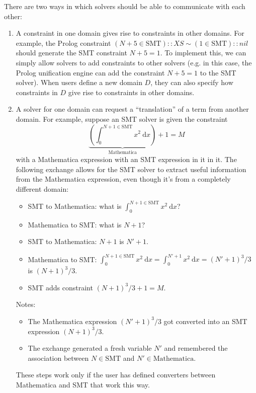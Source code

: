 \documentclass[10pt]{article}
\begin{document}
\noindent There are two ways in which solvers should be able to communicate
with each other: \begin{enumerate}
\item A constraint in one domain gives rise to constraints in other domains.
  For example, the Prolog constraint
  $(N + 5\in\textrm{SMT})::XS \sim (1\in\textrm{SMT})::nil$ should generate
  the SMT constraint $N + 5 = 1$. To implement this, we can simply
  allow solvers to add constraints to other solvers (e.g. in this case,
  the Prolog unification engine can add the constraint $N + 5 = 1$ to the
  SMT solver). When users define a new domain $D$, they can also specify how
  constraints in $D$ give rise to constraints in other domains.
\item A solver for one domain can request a ``translation'' of a term from another
  domain. For example, suppose an SMT solver is given the constraint
  \[{\underbrace{\left(\int_0^{N+1\in\textrm{SMT}}x^2~\mathrm dx\right)}
     _{\textrm{Mathematica}}} + 1 = M\]
  with a Mathematica expression with an SMT expression in it in it.
  The following exchange allows for the SMT
  solver to extract useful information from the Mathematica expression, even though
  it's from a completely different domain: \begin{itemize}
  \item SMT to Mathematica: what is
    $\displaystyle\int_0^{N+1\in\textrm{SMT}}x^2~\mathrm dx$?
  \item Mathematica to SMT: what is $N+1$?
  \item SMT to Mathematica: $N+1$ is $N'+1$.
  \item Mathematica to SMT:
    $\displaystyle\int_0^{N+1\in\textrm{SMT}}x^2~\mathrm dx
    =\displaystyle\int_0^{N'+1}x^2~\mathrm dx
    = (N'+1)^3/3$ is $(N+1)^3/3$.
  \item SMT adds constraint $(N+1)^3/3 + 1 = M$.
  \end{itemize}

  Notes: \begin{itemize}
  \item The Mathematica expression $(N'+1)^3/3$ got converted into an SMT expression
    $(N+1)^3/3$.
  \item The exchange generated a fresh variable $N'$ and remembered the
    association between $N\in \textrm{SMT}$ and $N'\in\textrm{Mathematica}$.
  \end{itemize}

  These steps work only if the user has defined converters between
  Mathematica and SMT that work this way.
\end{enumerate}
\end{document}
